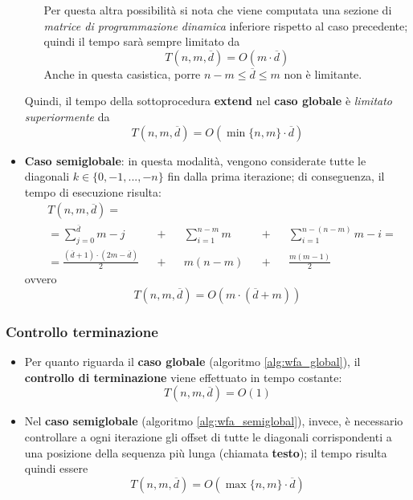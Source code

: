 \begin{itemize}
\begin{itemize}
                Per questa altra possibilità si nota che viene computata una sezione di \emph{matrice di programmazione dinamica} inferiore rispetto al caso precedente; quindi il tempo sarà sempre limitato da
                $$T(n, m, \overline{d}) = O(m \cdot \overline{d})$$
                Anche in questa casistica, porre $n-m \leq \overline{d} \leq m$ non è limitante.
        \end{itemize}
        Quindi, il tempo della sottoprocedura \textbf{extend} nel \textbf{caso globale} è \emph{limitato superiormente} da
        $$T(n, m, \overline{d}) = O(\min\{n, m\} \cdot \overline{d})$$
        
    \item \textbf{Caso semiglobale}: in questa modalità, vengono considerate tutte le diagonali $k \in \{0, -1, ..., -n\}$      fin dalla prima iterazione; di conseguenza, il tempo di esecuzione risulta:
        \begin{align*}
                    &T(n, m, \overline{d}) = \\ 
                    &= \sum_{j=0}^{\overline{d}}{m-j}& &+& &\sum_{i=1}^{n-m}{m}& &+& &\sum_{i=1}^{n-(n-m)}{m-i} = \\
                    &= \frac{(\overline{d}+1) \cdot (2m -\overline{d})}{2}& &+& &m(n-m)& &+& &\frac{m(m-1)}{2}
                \end{align*}
        ovvero
        \begin{equation*}
            T(n, m, \overline{d}) = O(m \cdot (\overline{d} + m))
        \end{equation*}
         
    \end{itemize}

\subsubsection{Controllo terminazione}
    \begin{itemize}
        \item Per quanto riguarda il \textbf{caso globale} (algoritmo \ref{alg:wfa_global}), il \textbf{controllo di terminazione} viene effettuato in tempo costante: 
        $$T(n, m, \overline{d}) = O(1)$$
        \item Nel \textbf{caso semiglobale} (algoritmo \ref{alg:wfa_semiglobal}), invece, è necessario controllare a ogni iterazione gli offset di tutte le diagonali corrispondenti a una posizione della sequenza più lunga (chiamata \textbf{testo}); il tempo risulta quindi essere 
        $$T(n, m, \overline{d}) = O(\max\{n, m\} \cdot \overline{d})$$ 
    \end{itemize}

